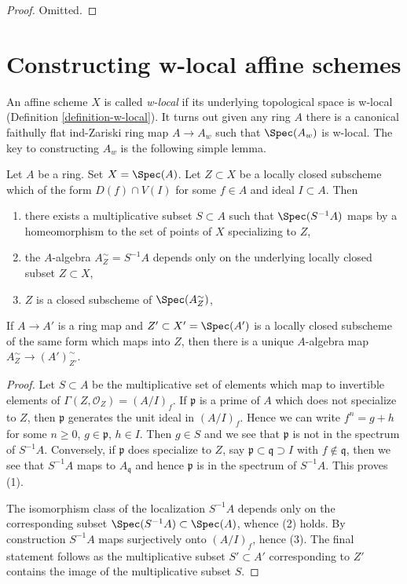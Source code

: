 \begin{proof}
Omitted.
\end{proof}







\section{Constructing w-local affine schemes}
\label{section-construction}

\noindent
An affine scheme $X$ is called {\it w-local} if its underlying
topological space is w-local (Definition \ref{definition-w-local}).
It turns out given any ring $A$ there is a canonical faithully
flat ind-Zariski ring map $A \to A_w$ such that $\Spec(A_w)$ is
w-local. The key to constructing $A_w$ is the following simple lemma.

\begin{lemma}
\label{lemma-localization}
Let $A$ be a ring. Set $X = \Spec(A)$. Let $Z \subset X$ be a locally closed
subscheme which of the form $D(f) \cap V(I)$ for some $f \in A$ and
ideal $I \subset A$. Then
\begin{enumerate}
\item there exists a multiplicative subset $S \subset A$ such that
$\Spec(S^{-1}A)$ maps by a homeomorphism to the set of points of $X$
specializing to $Z$,
\item the $A$-algebra $A_Z^\sim = S^{-1}A$ depends only on
the underlying locally closed subset $Z \subset X$,
\item $Z$ is a closed subscheme of $\Spec(A_Z^\sim)$,
\end{enumerate}
If $A \to A'$ is a ring map and $Z' \subset X' = \Spec(A')$ is a
locally closed subscheme of the same form which maps into $Z$,
then there is a unique $A$-algebra map
$A_Z^\sim \to (A')_{Z'}^\sim$.
\end{lemma}

\begin{proof}
Let $S \subset A$ be the multiplicative set of elements which map
to invertible elements of $\Gamma(Z, \mathcal{O}_Z) = (A/I)_f$.
If $\mathfrak p$ is a prime of $A$ which does not specialize to $Z$,
then $\mathfrak p$ generates the unit ideal in $(A/I)_f$. Hence
we can write $f^n =  g + h$ for some $n \geq 0$, $g \in \mathfrak p$,
$h \in I$. Then $g \in S$ and we see that $\mathfrak p$ is not in
the spectrum of $S^{-1}A$. Conversely, if $\mathfrak p$ does specialize
to $Z$, say $\mathfrak p \subset \mathfrak q \supset I$ with
$f \not \in \mathfrak q$, then we see that $S^{-1}A$ maps to
$A_\mathfrak q$ and hence $\mathfrak p$ is in the spectrum of $S^{-1}A$.
This proves (1).

\medskip\noindent
The isomorphism class of the localization $S^{-1}A$ depends only
on the corresponding subset $\Spec(S^{-1}A) \subset \Spec(A)$, whence
(2) holds. By construction $S^{-1}A$ maps surjectively onto
$(A/I)_f$, hence (3). The final statement follows as the multiplicative subset
$S' \subset A'$ corresponding to $Z'$ contains the image of the
multiplicative subset $S$.
\end{proof}

